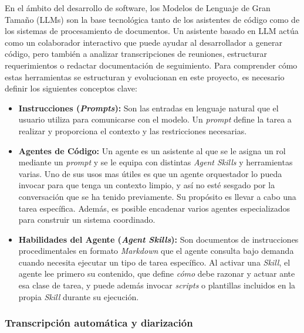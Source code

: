 \documentclass[11pt, letterpaper]{article}
\begin{document}
En el ámbito del desarrollo de software, los Modelos de Lenguaje de Gran Tamaño (LLMs) son la base tecnológica tanto de los asistentes de código como de los sistemas de procesamiento de documentos. Un asistente basado en LLM actúa como un colaborador interactivo que puede ayudar al desarrollador a generar código, pero también a analizar transcripciones de reuniones, estructurar requerimientos o redactar documentación de seguimiento. Para comprender cómo estas herramientas se estructuran y evolucionan en este proyecto, es necesario definir los siguientes conceptos clave:

\begin{itemize}
    \item \textbf{Instrucciones (\textit{Prompts}):} Son las entradas en lenguaje natural que el usuario utiliza para comunicarse con el modelo. Un \textit{prompt} define la tarea a realizar y proporciona el contexto y las restricciones necesarias.

    \item \textbf{Agentes de Código:} Un agente es un asistente al que se le asigna un rol mediante un \textit{prompt} y se le equipa con distintas \textit{Agent Skills} y herramientas varias. Uno de sus usos mas útiles es que un agente orquestador lo pueda invocar para que tenga un contexto limpio, y así no esté sesgado por la conversación que se ha tenido previamente. Su propósito es llevar a cabo una tarea específica. Además, es posible encadenar varios agentes especializados para construir un sistema coordinado. \cite{vscode_agents} \cite{wang_llm_agents_2024}

    \item \textbf{Habilidades del Agente (\textit{Agent Skills}):} Son documentos de instrucciones procedimentales en formato \textit{Markdown} que el agente consulta bajo demanda cuando necesita ejecutar un tipo de tarea específico. Al activar una \textit{Skill}, el agente lee primero su contenido, que define \textit{cómo} debe razonar y actuar ante esa clase de tarea, y puede además invocar \textit{scripts} o plantillas incluidos en la propia \textit{Skill} durante su ejecución. \cite{agentskills_home} \cite{yao_react_2023}
\end{itemize}

\subsubsection{Transcripción automática y diarización}
\label{sec:transcripcion_diarizacion}
\end{document}
